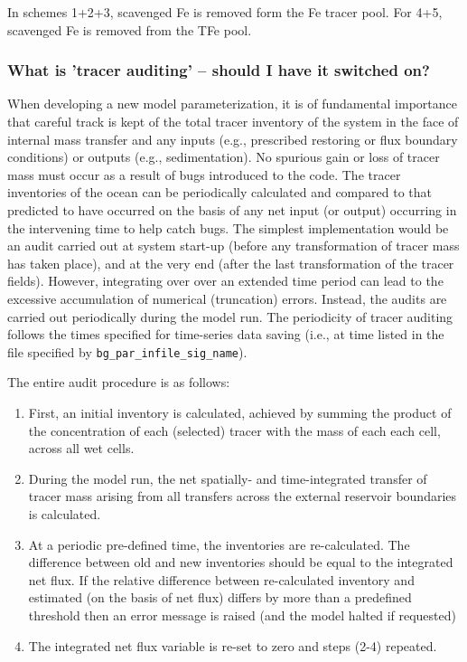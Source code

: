 \documentclass[11pt,fleqn]{book} %
\begin{document}
In schemes 1+2+3, scavenged Fe is removed form the Fe tracer pool. For 4+5, scavenged Fe is removed from the TFe pool.


%
\subsubsection{What is 'tracer auditing' -- should I have it switched on?}

When developing a new model parameterization, it is of fundamental importance that careful track is kept of the total tracer inventory of the system in the face of internal mass transfer and any inputs (e.g., prescribed restoring or flux boundary conditions) or outputs (e.g., sedimentation). No spurious gain or loss of tracer mass must occur as a result of bugs introduced to the code. The tracer inventories of the ocean can be periodically calculated and compared to that predicted to have occurred on the basis of any net input (or output) occurring in the intervening time to help catch bugs. The simplest implementation would be an audit carried out at system start-up (before any transformation of tracer mass has taken place), and at the very end (after the last transformation of the tracer fields). However, integrating over over an extended time period can lead to the excessive accumulation of numerical (truncation) errors. Instead, the audits are carried out periodically during the model run. The periodicity of tracer auditing follows the times specified for time-series data saving (i.e., at time listed in the file specified by \texttt{bg\_par\_infile\_sig\_name}).

The entire audit procedure is as follows:

\begin{enumerate}[noitemsep]
\setlength{\itemindent}{.2in}

\item First, an initial inventory is calculated, achieved by summing the product of the concentration of each (selected) tracer with the mass of each each cell, across all wet cells.
\item During the model run, the net spatially- and time-integrated transfer of tracer mass arising from all transfers across the external reservoir boundaries is calculated.
\item At a periodic pre-defined time, the inventories are re-calculated. The difference between old and new inventories should be equal to the integrated net flux. If the relative difference between re-calculated inventory and estimated (on the basis of net flux) differs by more than a predefined threshold then an error message is raised (and the model halted if requested)
\item The integrated net flux variable is re-set to zero and steps (2-4) repeated.

\end{enumerate}
\end{document}
